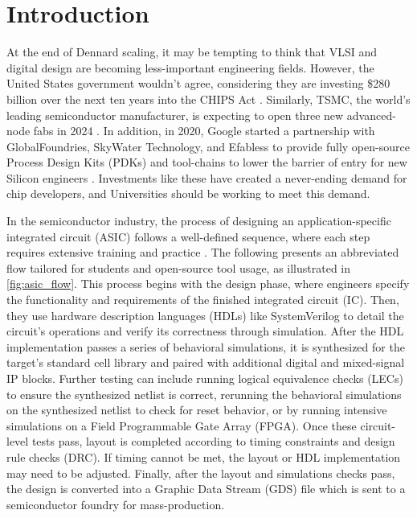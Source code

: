 
\chapter{Introduction}
\label{chapter:introduction}

At the end of Dennard scaling, it may be tempting to think that VLSI and digital design are becoming less-important engineering fields.
However, the United States government wouldn't agree, considering they are investing \$280 billion over the next ten years into the CHIPS Act \cite{mckinsey}.
Similarly, TSMC, the world's leading semiconductor manufacturer, is expecting to open three new advanced-node fabs in 2024 \cite{taipeitimes}.
In addition, in 2020, Google started a partnership with GlobalFoundries, SkyWater Technology, and Efabless to provide fully open-source Process Design Kits (PDKs) and tool-chains to lower the barrier of entry for new Silicon engineers \cite{GooglePartnersWithSkyWater, googleSilicon}.
Investments like these have created a never-ending demand for chip developers, and Universities should be working to meet this demand.



In the semiconductor industry, the process of designing an application-specific integrated circuit (ASIC) follows a well-defined sequence, where each step requires extensive training and practice \cite{intelDesignFlow, anysiliconDesignFlow, kynixDesignFlow}.
The following presents an abbreviated flow tailored for students and open-source tool usage, as illustrated in \autoref{fig:asic_flow}.
This process begins with the design phase, where engineers specify the functionality and requirements of the finished integrated circuit (IC).
Then, they use hardware description languages (HDLs) like SystemVerilog to detail the circuit's operations and verify its correctness through simulation.
After the HDL implementation passes a series of behavioral simulations, it is synthesized for the target's standard cell library and paired with additional digital and mixed-signal IP blocks.
Further testing can include running logical equivalence checks (LECs) to ensure the synthesized netlist is correct, rerunning the behavioral simulations on the synthesized netlist to check for reset behavior, or by running intensive simulations on a Field Programmable Gate Array (FPGA).
Once these circuit-level tests pass, layout is completed according to timing constraints and design rule checks (DRC).
If timing cannot be met, the layout or HDL implementation may need to be adjusted.
Finally, after the layout and simulations checks pass, the design is converted into a Graphic Data Stream (GDS) file which is sent to a semiconductor foundry for mass-production.

